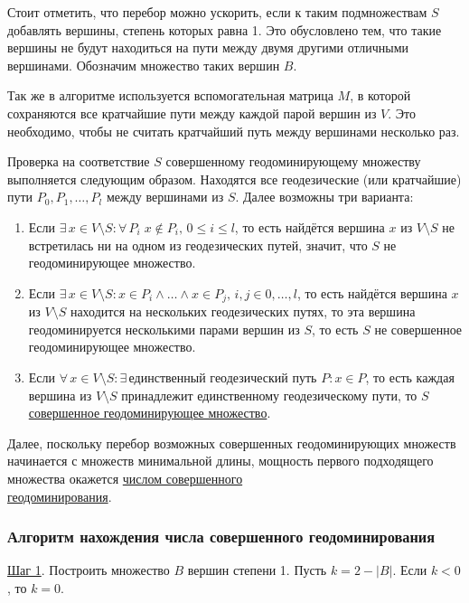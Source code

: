 \documentclass[bachelor, och, nir]{SCWorks}
\begin{document}
Стоит отметить, что перебор можно ускорить, если к таким подмножествам $S$ 
добавлять вершины, степень которых равна 1. Это обусловлено тем, что такие вершины не будут
находиться на пути между двумя другими отличными вершинами. Обозначим множество
таких вершин $B$.

Так же в алгоритме используется вспомогательная матрица $M$, в которой сохраняются
все кратчайшие пути между каждой парой вершин из $V$. Это необходимо, чтобы не считать
кратчайший путь между вершинами несколько раз.

Проверка на соответствие $S$ совершенному геодоминирующему множеству
выполняется следующим образом. Находятся все геодезические (или кратчайшие) пути $P_0, P_1, \dots, P_l$ между вершинами из $S$.
Далее возможны три варианта:
\begin{enumerate}
    \item Если $\exists \, x \in V \setminus S: \forall \, P_i \; x \notin P_i, \, 0 \leq i \leq l$, то есть найдётся вершина $x$ из $V \setminus S$ не встретилась ни на одном из геодезических путей,
    значит, что $S$ не геодоминирующее множество.
    \item Если $\exists \, x \in V \setminus S: x \in P_i \wedge \dots \wedge x \in P_j, \, i, j \in 0, \dots, l$, то есть найдётся вершина $x$ из $V \setminus S$ находится на нескольких геодезических путях, то
    эта вершина геодоминируется несколькими парами вершин из $S$, то есть $S$ не совершенное геодоминирующее
    множество. 
    \item Если $\forall \, x \in V \setminus S: \exists \, \text{единственный геодезический путь } P: x \in P$, то есть каждая вершина из $V \setminus S$ принадлежит единственному геодезическому пути, то $S$ \underline{совершенное геодоминирующее множество}.
\end{enumerate}

Далее, поскольку перебор возможных совершенных геодоминирующих множеств начинается с множеств минимальной длины, мощность первого подходящего множества окажется \underline{числом совершенного} \\
\underline{геодоминирования}.

\subsubsection{Алгоритм нахождения числа совершенного геодоминирования}

\underline{Шаг 1}. Построить множество $B$ вершин степени 1. 
Пусть $k = 2 - |B|$. Если $k < 0$, то $k = 0$. 
\end{document}
